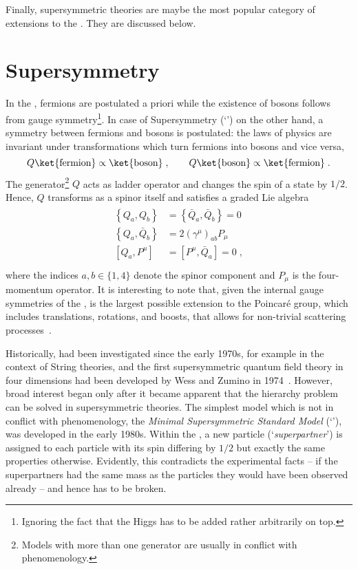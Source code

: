 Finally, supersymmetric theories are maybe the most popular category of extensions to the \sm.
They are discussed below.



\section{Supersymmetry}\label{sec:Theory:SUSY}
In the \sm, fermions are postulated a priori while the existence of bosons follows from gauge symmetry\footnote{Ignoring the fact that the Higgs has to be added rather arbitrarily on top.}.
In case of Supersymmetry (`\susy') on the other hand, a symmetry between fermions and bosons is postulated: the laws of physics are invariant under \susy transformations which turn fermions into bosons and vice versa,
\begin{equation*}
  Q\ket{\text{fermion}}\propto\ket{\text{boson}}\;,\qquad Q\ket{\text{boson}}\propto\ket{\text{fermion}} \;.
\end{equation*}
The \susy generator\footnote{Models with more than one \susy generator are usually in conflict with phenomenology.} $Q$ acts as ladder operator and changes the spin of a state by $1/2$.
Hence, $Q$ transforms as a spinor itself and satisfies a graded Lie algebra
\begin{align}\label{eq:Theory:SUSY:Algebra}
  \begin{split}
    \left\{Q_{a},Q_{b}\right\} & = \left\{\bar{Q}_{a},\bar{Q}_{b}\right\} = 0 \\
    \left\{Q_{a},\bar{Q}_{b}\right\} & = 2\left(\gamma^{\mu}\right)_{ab}P_{\mu} \\
    \left[Q_{a},P^{\mu}\right] & = \left[P^{\mu},\bar{Q}_{a}\right] = 0 \;, \\
  \end{split}
\end{align}
where the indices \mbox{$a,b\in\{1,4\}$} denote the spinor component and $P_{\mu}$ is the four-momentum operator.
It is interesting to note that, given the internal gauge symmetries of the \sm, \susy is the largest possible extension to the Poincar\'{e} group, which includes translations, rotations, and boosts, that allows for non-trivial scattering processes~\cite{bib:Haag1975257}.

Historically, \susy had been investigated since the early 1970s, for example in the context of String theories, and the first supersymmetric quantum field theory in four dimensions had been developed by Wess and Zumino in 1974~\cite{bib:WessZumino}.
However, broad interest began only after it became apparent that the hierarchy problem can be solved in supersymmetric theories.
The simplest \susy model which is not in conflict with phenomenology, the \emph{Minimal Supersymmetric Standard Model} (`\mssm'), was developed in the early 1980s.
Within the \mssm, a new particle (`\emph{superpartner}') is assigned to each \sm particle with its spin differing by $1/2$ but exactly the same properties otherwise.
Evidently, this contradicts the experimental facts -- if the superpartners had the same mass as the \sm particles they would have been observed already -- and hence \susy has to be broken.

